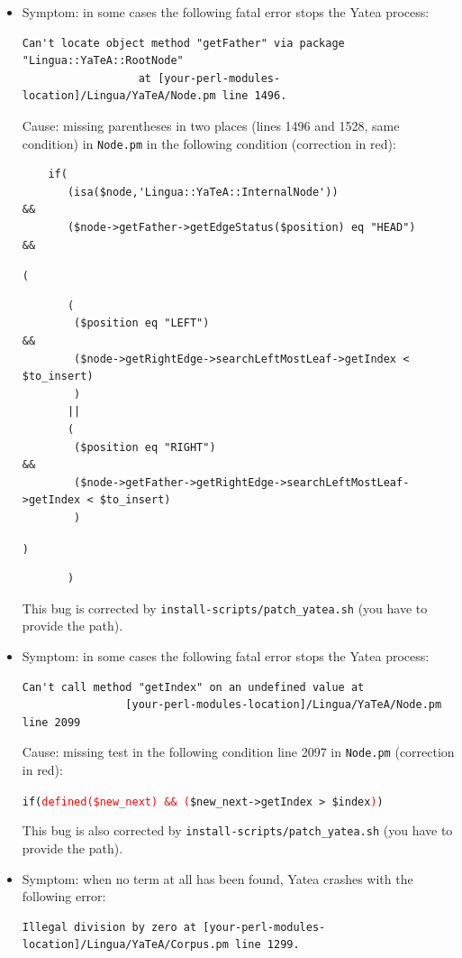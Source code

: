 \documentclass{article}
\begin{document}
\begin{itemize}
\item Symptom: in some cases the following fatal error stops the Yatea process:

\begin{verbatim}
Can't locate object method "getFather" via package "Lingua::YaTeA::RootNode" 
                  at [your-perl-modules-location]/Lingua/YaTeA/Node.pm line 1496.
\end{verbatim}

Cause: missing parentheses in two places (lines 1496 and 1528, same condition) in {\tt Node.pm} in the following condition (correction in red):
\begin{verbatim}
    if(
       (isa($node,'Lingua::YaTeA::InternalNode'))
&&
       ($node->getFather->getEdgeStatus($position) eq "HEAD")
&&
\end{verbatim}
{\color{red} \tt  (}
\begin{verbatim}
       (
        ($position eq "LEFT")
&&
        ($node->getRightEdge->searchLeftMostLeaf->getIndex < $to_insert)
        )
       ||
       (
        ($position eq "RIGHT")
&&
        ($node->getFather->getRightEdge->searchLeftMostLeaf->getIndex < $to_insert)
        )
\end{verbatim}
{\color{red} \tt  )}
\begin{verbatim}
       ) 
\end{verbatim}

This bug is corrected by {\tt install-scripts/patch\_yatea.sh} (you have to provide the path).

\item Symptom: in some cases the following fatal error stops the Yatea process:
\begin{verbatim}
Can't call method "getIndex" on an undefined value at 
                [your-perl-modules-location]/Lingua/YaTeA/Node.pm line 2099
\end{verbatim}

Cause: missing test in the following condition line 2097 in {\tt Node.pm} (correction in red):

\verb+if(+\textcolor{red}{\tt defined(\$new\_next) \&\& (}\verb+$new_next->getIndex > $index+{\tt\textcolor{red}{)})}

This bug is also corrected by {\tt install-scripts/patch\_yatea.sh} (you have to provide the path).

\item Symptom: when no term at all has been found, Yatea crashes with the following error:
\begin{verbatim}
Illegal division by zero at [your-perl-modules-location]/Lingua/YaTeA/Corpus.pm line 1299.
\end{verbatim}


\end{itemize}
\end{document}
